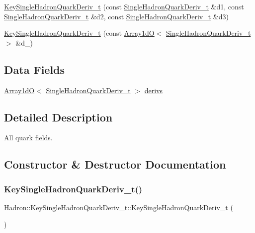 \begin{DoxyCompactItemize}
\item 
\mbox{\hyperlink{structHadron_1_1KeySingleHadronQuarkDeriv__t_a228d03db64fbe8db5371d92e4fb3806e}{Key\+Single\+Hadron\+Quark\+Deriv\+\_\+t}} (const \mbox{\hyperlink{structHadron_1_1SingleHadronQuarkDeriv__t}{Single\+Hadron\+Quark\+Deriv\+\_\+t}} \&d1, const \mbox{\hyperlink{structHadron_1_1SingleHadronQuarkDeriv__t}{Single\+Hadron\+Quark\+Deriv\+\_\+t}} \&d2, const \mbox{\hyperlink{structHadron_1_1SingleHadronQuarkDeriv__t}{Single\+Hadron\+Quark\+Deriv\+\_\+t}} \&d3)
\item 
\mbox{\hyperlink{structHadron_1_1KeySingleHadronQuarkDeriv__t_a35ce6c87867b7b8938820f4869b3f91c}{Key\+Single\+Hadron\+Quark\+Deriv\+\_\+t}} (const \mbox{\hyperlink{classADAT_1_1Array1dO}{Array1dO}}$<$ \mbox{\hyperlink{structHadron_1_1SingleHadronQuarkDeriv__t}{Single\+Hadron\+Quark\+Deriv\+\_\+t}} $>$ \&d\+\_\+)
\end{DoxyCompactItemize}
\subsection*{Data Fields}
\begin{DoxyCompactItemize}
\item 
\mbox{\hyperlink{classADAT_1_1Array1dO}{Array1dO}}$<$ \mbox{\hyperlink{structHadron_1_1SingleHadronQuarkDeriv__t}{Single\+Hadron\+Quark\+Deriv\+\_\+t}} $>$ \mbox{\hyperlink{structHadron_1_1KeySingleHadronQuarkDeriv__t_a338eadc820e14621fa645cc418c1e0fb}{derivs}}
\end{DoxyCompactItemize}


\subsection{Detailed Description}
All quark fields. 

\subsection{Constructor \& Destructor Documentation}
\mbox{\label{structHadron_1_1KeySingleHadronQuarkDeriv__t_a0f700137eb8da25f983d2fe6cf1b4576}} 
\subsubsection{\texorpdfstring{KeySingleHadronQuarkDeriv\_t()}{KeySingleHadronQuarkDeriv\_t()}\hspace{0.1cm}{\footnotesize\ttfamily [1/10]}}
{\footnotesize\ttfamily Hadron\+::\+Key\+Single\+Hadron\+Quark\+Deriv\+\_\+t\+::\+Key\+Single\+Hadron\+Quark\+Deriv\+\_\+t (\begin{DoxyParamCaption}{ }\end{DoxyParamCaption})\hspace{0.3cm}{\ttfamily [inline]}}

